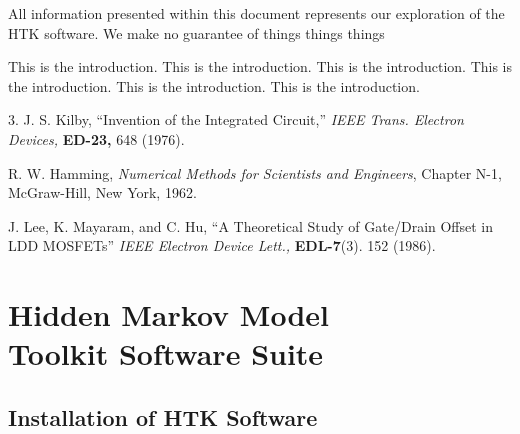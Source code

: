 \documentclass{wileySev}
\begin{document}

\subtitle{Probabilistic Accent Detection Using Hidden Markov Models}


\titlepage
\tableofcontents


\begin{preface}
All information presented within this document represents our exploration of the HTK software. We make no guarantee of things things things

\end{preface}

\begin{introduction}
This is the introduction.
This is the introduction.
This is the introduction.
This is the introduction.
This is the introduction.
This is the introduction.


\begin{chapreferences}{3.}
J. S. Kilby,
``Invention of the Integrated Circuit,'' {\it IEEE Trans. Electron Devices,}
{\bf ED-23,} 648 (1976).

R. W. Hamming,
                 {\it Numerical Methods for Scientists and 
                 Engineers}, Chapter N-1, McGraw-Hill, 
                 New York, 1962.

J. Lee, K. Mayaram, and C. Hu, ``A Theoretical
               Study of Gate/Drain Offset in LDD MOSFETs''
                     {\it IEEE Electron Device Lett.,} {\bf EDL-7}(3). 152 
                     (1986).
\end{chapreferences}
\end{introduction}


\part[HTK Software Suite]
{Hidden Markov Model\\Toolkit Software Suite}

\chapter{Installation of HTK Software}
\end{document}
